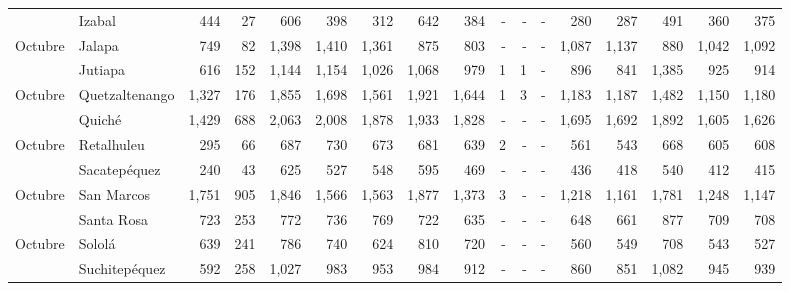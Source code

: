 \begin{landscape}
\begin{center}
\begin{longtable}{llrrrrrrrrrrrrrrr}
\rowcolor{color1!5!white}\multicolumn{1}{l}{	\footnotesize	 Octubre 	}&	 Izabal 	&	 444 	&	 27 	&	 606 	&	 398 	&	 312 	&	 642 	&	 384 	&	 -   	&	 -   	&	 -   	&	 280 	&	 287 	&	 491 	&	 360 	&	 375 	\\
\multicolumn{1}{l}{	\footnotesize	 Octubre 	}&	 Jalapa 	&	 749 	&	 82 	&	 1,398 	&	 1,410 	&	 1,361 	&	 875 	&	 803 	&	 -   	&	 -   	&	 -   	&	 1,087 	&	 1,137 	&	 880 	&	 1,042 	&	 1,092 	\\
\rowcolor{color1!5!white}\multicolumn{1}{l}{	\footnotesize	 Octubre 	}&	 Jutiapa 	&	 616 	&	 152 	&	 1,144 	&	 1,154 	&	 1,026 	&	 1,068 	&	 979 	&	 1 	&	 1 	&	 -   	&	 896 	&	 841 	&	 1,385 	&	 925 	&	 914 	\\
\multicolumn{1}{l}{	\footnotesize	 Octubre 	}&	 Quetzaltenango 	&	 1,327 	&	 176 	&	 1,855 	&	 1,698 	&	 1,561 	&	 1,921 	&	 1,644 	&	 1 	&	 3 	&	 -   	&	 1,183 	&	 1,187 	&	 1,482 	&	 1,150 	&	 1,180 	\\
\rowcolor{color1!5!white}\multicolumn{1}{l}{	\footnotesize	 Octubre 	}&	 Quiché 	&	 1,429 	&	 688 	&	 2,063 	&	 2,008 	&	 1,878 	&	 1,933 	&	 1,828 	&	 -   	&	 -   	&	 -   	&	 1,695 	&	 1,692 	&	 1,892 	&	 1,605 	&	 1,626 	\\
\multicolumn{1}{l}{	\footnotesize	 Octubre 	}&	 Retalhuleu 	&	 295 	&	 66 	&	 687 	&	 730 	&	 673 	&	 681 	&	 639 	&	 2 	&	 -   	&	 -   	&	 561 	&	 543 	&	 668 	&	 605 	&	 608 	\\
\rowcolor{color1!5!white}\multicolumn{1}{l}{	\footnotesize	 Octubre 	}&	 Sacatepéquez 	&	 240 	&	 43 	&	 625 	&	 527 	&	 548 	&	 595 	&	 469 	&	 -   	&	 -   	&	 -   	&	 436 	&	 418 	&	 540 	&	 412 	&	 415 	\\
\multicolumn{1}{l}{	\footnotesize	 Octubre 	}&	 San Marcos 	&	 1,751 	&	 905 	&	 1,846 	&	 1,566 	&	 1,563 	&	 1,877 	&	 1,373 	&	 3 	&	 -   	&	 -   	&	 1,218 	&	 1,161 	&	 1,781 	&	 1,248 	&	 1,147 	\\
\rowcolor{color1!5!white}\multicolumn{1}{l}{	\footnotesize	 Octubre 	}&	 Santa Rosa 	&	 723 	&	 253 	&	 772 	&	 736 	&	 769 	&	 722 	&	 635 	&	 -   	&	 -   	&	 -   	&	 648 	&	 661 	&	 877 	&	 709 	&	 708 	\\
\multicolumn{1}{l}{	\footnotesize	 Octubre 	}&	 Sololá 	&	 639 	&	 241 	&	 786 	&	 740 	&	 624 	&	 810 	&	 720 	&	 -   	&	 -   	&	 -   	&	 560 	&	 549 	&	 708 	&	 543 	&	 527 	\\
\rowcolor{color1!5!white}\multicolumn{1}{l}{	\footnotesize	 Octubre 	}&	 Suchitepéquez 	&	 592 	&	 258 	&	 1,027 	&	 983 	&	 953 	&	 984 	&	 912 	&	 -   	&	 -   	&	 -   	&	 860 	&	 851 	&	 1,082 	&	 945 	&	 939 	\\

\end{longtable}
\end{center}
\end{landscape}
